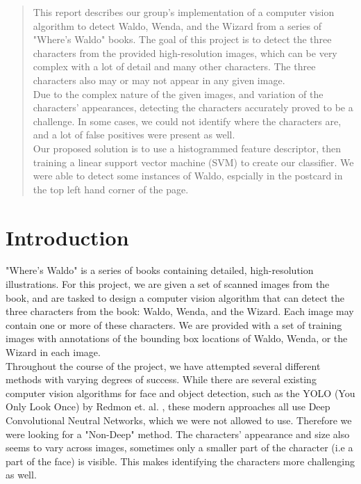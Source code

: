 \documentclass[11pt]{article}
\begin{document}
	

\begin{abstract}
This report describes our group's implementation of a computer vision algorithm to detect Waldo, Wenda, and the Wizard from a series of "Where's Waldo" books. The goal of this project is to detect the three characters from the provided high-resolution images, which can be very complex with a lot of detail and many other characters. The three characters also may or may not appear in any given image.\\

Due to the complex nature of the given images, and variation of the characters' appearances, detecting the characters accurately proved to be a challenge. In some cases, we could not identify where the characters are, and a lot of false positives were present as well.\\

Our proposed solution is to use a histogrammed feature descriptor, then training a linear support vector machine (SVM) to create our classifier. We were able to detect some instances of Waldo, espcially in the postcard in the top left hand corner of the page.


\end{abstract}
\section{Introduction}

"Where's Waldo" is a series of books containing detailed, high-resolution illustrations. For this project, we are given a set of scanned images from the book, and are tasked to design a computer vision algorithm that can detect the three characters from the book: Waldo, Wenda, and the Wizard. Each image may contain one or more of these characters. We are provided with a set of training images with annotations of the bounding box locations of Waldo, Wenda, or the Wizard in each image.\\

Throughout the course of the project, we have attempted several different methods with varying degrees of success. 
While there are several existing computer vision algorithms for face and object detection, 
such as the YOLO (You Only Look Once) by Redmon et. al. \cite{redmon2016yolo}, these modern approaches
all use Deep Convolutional Neutral Networks, which we were not allowed to use. Therefore we were looking for a "Non-Deep" method.
The characters' appearance and size also seems to vary across images, sometimes only a smaller part of the character (i.e a part of the face) is visible. This makes identifying the characters more challenging as well.\\
\end{document}
